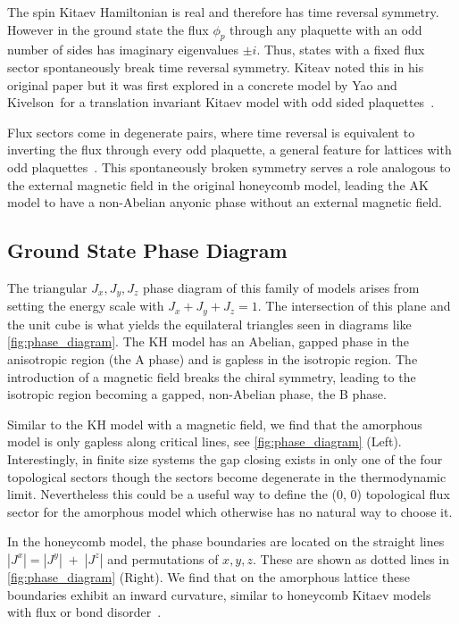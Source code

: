 The spin Kitaev Hamiltonian is real and therefore has time reversal symmetry. However in the ground state the flux \(\phi_p\) through any plaquette with an odd number of sides has imaginary eigenvalues \(\pm i\). Thus, states with a fixed flux sector spontaneously break time reversal symmetry. Kiteav noted this in his original paper but it was first explored in a concrete model by Yao and Kivelson~for a translation invariant Kitaev model with odd sided plaquettes~\autocite{Yao2011}.

Flux sectors come in degenerate pairs, where time reversal is equivalent to inverting the flux through every odd plaquette, a general feature for lattices with odd plaquettes~\autocite{yaoExactChiralSpin2007,Peri2020}. This spontaneously broken symmetry serves a role analogous to the external magnetic field in the original honeycomb model, leading the AK model to have a non-Abelian anyonic phase without an external magnetic field.

\hypertarget{ground-state-phase-diagram}{%
\subsection{Ground State Phase Diagram}\label{ground-state-phase-diagram}}

The triangular \(J_x, J_y, J_z\) phase diagram of this family of models arises from setting the energy scale with \(J_x + J_y + J_z = 1\). The intersection of this plane and the unit cube is what yields the equilateral triangles seen in diagrams like \cref{fig:phase_diagram}. The KH model has an Abelian, gapped phase in the anisotropic region (the A phase) and is gapless in the isotropic region. The introduction of a magnetic field breaks the chiral symmetry, leading to the isotropic region becoming a gapped, non-Abelian phase, the B phase.

Similar to the KH model with a magnetic field, we find that the amorphous model is only gapless along critical lines, see \cref{fig:phase_diagram} (Left). Interestingly, in finite size systems the gap closing exists in only one of the four topological sectors though the sectors become degenerate in the thermodynamic limit. Nevertheless this could be a useful way to define the (0, 0) topological flux sector for the amorphous model which otherwise has no natural way to choose it.

In the honeycomb model, the phase boundaries are located on the straight lines \(|J^x| = |J^y| \;+ \;|J^z|\) and permutations of \(x,y,z\). These are shown as dotted lines in \cref{fig:phase_diagram} (Right). We find that on the amorphous lattice these boundaries exhibit an inward curvature, similar to honeycomb Kitaev models with flux or bond disorder~\autocite{knolle_dynamics_2016,Nasu_Thermal_2015,lahtinenPerturbedVortexLattices2014,willansDisorderQuantumSpin2010,zschockePhysicalStatesFinitesize2015,kaoDisorderDisorderLocalization2021}.

